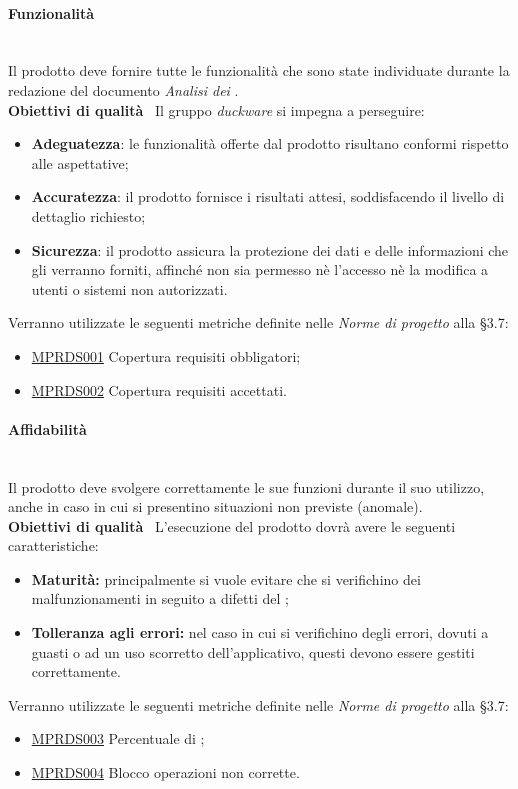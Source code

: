 \paragraph{Funzionalità}\mbox{}\\
Il prodotto deve fornire tutte le funzionalità che sono state individuate durante la redazione del documento \emph{Analisi dei }.\\[0.4cm]
\textbf{Obiettivi di qualità} \ Il gruppo \emph{duckware} si impegna a perseguire:
\begin{itemize}
	\item \textbf{Adeguatezza}: le funzionalità offerte dal prodotto risultano conformi rispetto alle aspettative;
	\item \textbf{Accuratezza}: il prodotto fornisce i risultati attesi, soddisfacendo il livello di dettaglio richiesto;
	\item \textbf{Sicurezza}: il prodotto assicura la protezione dei dati e delle informazioni che gli verranno forniti, affinché non sia permesso nè l'accesso nè la modifica a utenti o sistemi non autorizzati.
\end{itemize}
Verranno utilizzate le seguenti metriche definite nelle \textit{Norme di progetto} alla §3.7:
\begin{itemize}
	\item \hyperref[sec:qualita_software]{MPRDS001} Copertura requisiti obbligatori;
	\item \hyperref[sec:qualita_software]{MPRDS002} Copertura requisiti accettati.
\end{itemize}

\paragraph{Affidabilità}\mbox{}\\[0.4cm]
Il prodotto  deve svolgere correttamente le sue funzioni durante il suo utilizzo, anche in caso in cui si presentino situazioni non previste (anomale).\\ 
\textbf{Obiettivi di qualità} \ L'esecuzione del prodotto dovrà avere le seguenti caratteristiche:
\begin{itemize}
	\item \textbf{Maturità:} principalmente si vuole evitare che si verifichino dei malfunzionamenti in seguito a difetti del ;
	\item \textbf{Tolleranza agli errori:} nel caso in cui si verifichino degli errori, dovuti a guasti o ad un uso scorretto dell'applicativo, questi devono essere gestiti correttamente.
\end{itemize}
Verranno utilizzate le seguenti metriche definite nelle \textit{Norme di progetto} alla §3.7:
\begin{itemize}
	\item \hyperref[sec:qualita_software]{MPRDS003} Percentuale di ;
	\item \hyperref[sec:qualita_software]{MPRDS004} Blocco operazioni non corrette.
\end{itemize}

